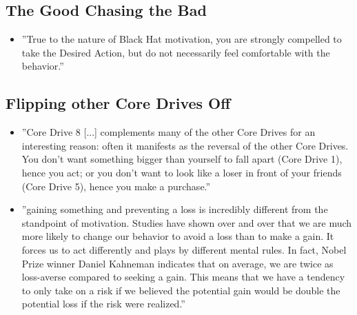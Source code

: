 \subsection{The Good Chasing the Bad}
    \begin{itemize}
        \item ''True to the nature of Black Hat motivation, you are strongly compelled to take the Desired Action, but do not necessarily feel comfortable with the behavior.''
    \end{itemize}
    
\subsection{Flipping other Core Drives Off}
    \begin{itemize}
        \item ''Core Drive 8 [...] complements many of the other Core Drives for an interesting reason: often it manifests as the reversal of the other Core Drives. You don't want something bigger than yourself to fall apart (Core Drive 1), hence you act; or you don't want to look like a loser in front of your friends (Core Drive 5), hence you make a purchase.''
        \item ''gaining something and preventing a loss is incredibly different from the standpoint of motivation. Studies have shown over and over that we are much more likely to change our behavior to avoid a loss than to make a gain. It forces us to act differently and plays by different mental rules. In fact, Nobel Prize winner Daniel Kahneman indicates that on average, we are twice as loss-averse compared to seeking a gain. This means that we have a tendency to only take on a risk if we believed the potential gain would be double the potential loss if the risk were realized.''
    \end{itemize}

